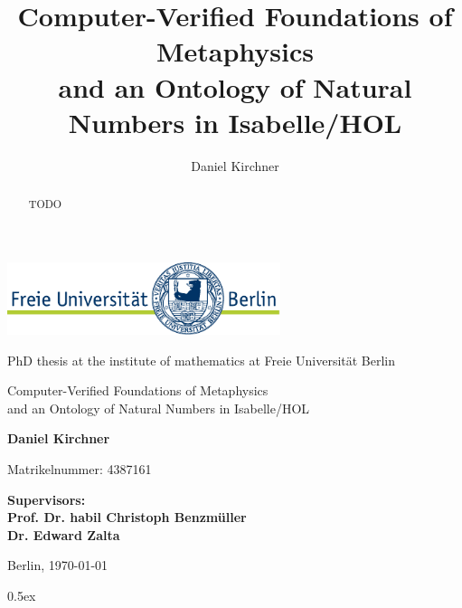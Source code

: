 \documentclass[a4paper,enabledeprecatedfontcommands,abstract=on,twoside=true,bibliography=totoc]{scrreprt}
\title{Computer-Verified Foundations of Metaphysics\\ and an Ontology of Natural Numbers in Isabelle/HOL}
\author{Daniel Kirchner}
\numberwithin{TODO}{chapter}
\numberwithin{equation}{section}
\begin{document}
\begin{titlepage}
\vspace{1cm}

\begin{center}
    \includegraphics[width=0.6\textwidth]{logo}
    \vspace{1cm}


PhD thesis at the institute of mathematics at Freie Universit\"at Berlin

    \vspace{2cm}


    \Large{\textsf{Computer-Verified Foundations of Metaphysics\\ and an Ontology of Natural Numbers in Isabelle/HOL}}

    \vspace{2cm}

    \large{\textbf{Daniel Kirchner}}

	\vspace{0.25cm}

	\small{Matrikelnummer: 4387161}

    \vspace{2cm}

    \large{\textbf{
        Supervisors:\\
Prof. Dr. habil Christoph Benzm\"uller\\
Dr. Edward Zalta
    }}

    \vspace{2cm}
    \large{Berlin, \today}
\end{center}
\end{titlepage}

\cleardoublepage

\begin{abstract}
TODO
\end{abstract}

\cleardoublepage

\tableofcontents

\cleardoublepage

\parindent 0pt\parskip 0.5ex




\end{document}
